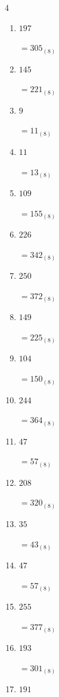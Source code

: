 \begin{multicols}{4}
\begin{enumerate}
  \item $197$

        $=305_{(8)}$

  \item $145$

        $=221_{(8)}$

  \item $9$

        $=11_{(8)}$

  \item $11$

        $=13_{(8)}$

  \item $109$

        $=155_{(8)}$

  \item $226$

        $=342_{(8)}$

\columnbreak %

  \item $250$

        $=372_{(8)}$

  \item $149$

        $=225_{(8)}$

  \item $104$

        $=150_{(8)}$

  \item $244$

        $=364_{(8)}$

  \item $47$

        $=57_{(8)}$

  \item $208$

        $=320_{(8)}$

  \item $35$

        $=43_{(8)}$

  \item $47$

        $=57_{(8)}$

  \item $255$

        $=377_{(8)}$

  \item $193$

        $=301_{(8)}$

  \item $191$


\end{enumerate}
\end{multicols}
